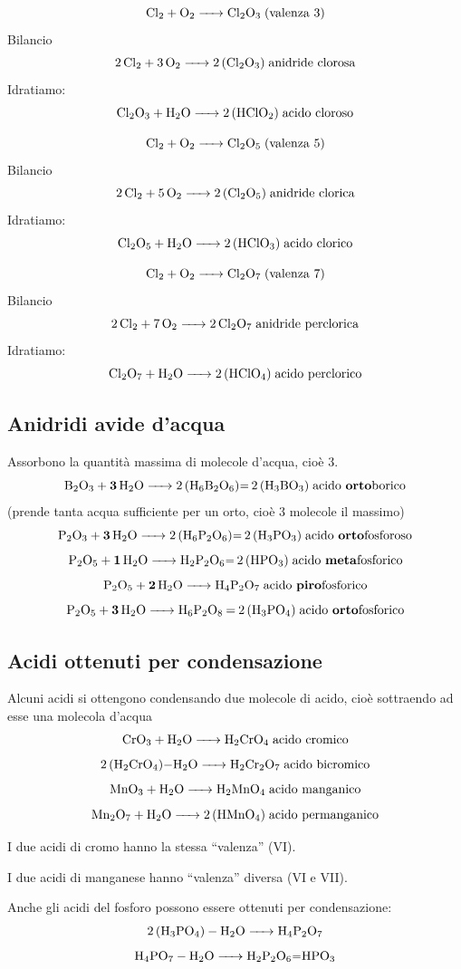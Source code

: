 $$\ce{Cl_2 + O_2 -> Cl_2O_3} \; \text{(valenza 3)}$$ Bilancio
$$\ce{2 Cl_2 + 3 O_2 -> 2 (Cl_2O_3)} \; \text{anidride clorosa}$$
Idratiamo:
$$\ce{Cl_2O_3 + H_2O -> 2 (HClO_2) } \; \text{acido cloroso}$$

$$\ce{Cl_2 + O_2 -> Cl_2O_5} \; \text{(valenza 5)}$$ Bilancio
$$\ce{2 Cl_2 + 5 O_2 -> 2 (Cl_2O_5)} \; \text{anidride clorica}$$
Idratiamo:
$$\ce{Cl_2O_5 + H_2O -> 2 (HClO_3)} \; \text{acido clorico}$$

$$\ce{Cl_2 + O_2 -> Cl_2O_7} \; \text{(valenza 7)}$$ Bilancio
$$\ce{2 Cl_2 + 7 O_2 -> 2 Cl_2O_7} \; \text{anidride perclorica}$$
Idratiamo:
$$\ce{Cl_2O_7 + H_2O -> 2 (HClO_4)} \; \text{acido perclorico}$$

\subsection{Anidridi avide d'acqua}
Assorbono la quantità massima di molecole d'acqua, cioè 3.
$$\ce{B_2O_3 + \textbf{3} H_2O -> 2 (H_6B_2O_6)= 2 (H_3BO_3)} \; \text{acido \textbf{orto}borico}$$\hspace{+1.2cm}(prende tanta acqua sufficiente per un orto, cioè 3 molecole il massimo)
$$\ce{P_2O_3 + \textbf{3} H_2O -> 2 (H_6P_2O_6)= 2 (H_3PO_3)} \; \text{acido \textbf{orto}fosforoso}$$
$$\ce{P_2O_5 + \textbf{1} H_2O -> H_2P_2O_6= 2 (HPO_3)} \; \text{acido \textbf{meta}fosforico}$$
$$\ce{P_2O_5 + \textbf{2} H_2O -> H_4P_2O_7} \; \text{acido \textbf{piro}fosforico}$$
$$\ce{P_2O_5 + \textbf{3} H_2O -> H_6P_2O_8 = 2 (H_3PO_4)} \; \text{acido \textbf{orto}fosforico}$$
\subsection{Acidi ottenuti per condensazione}
Alcuni acidi si ottengono condensando due molecole di acido, cioè sottraendo ad esse una molecola d'acqua
$$\ce{CrO_3 + H_2O -> H_2CrO_4} \; \text{acido cromico}$$
$$\ce{2 (H_2CrO_4)-H_2O -> H_2Cr_2O_7} \; \text{acido bicromico}$$
$$\ce{MnO_3 + H_2O -> H_2MnO_4} \; \text{acido manganico}$$
$$\ce{Mn_2O_7 + H_2O -> 2 (HMnO_4)} \; \text{acido permanganico}$$

I due acidi di cromo hanno la stessa ``valenza” (VI).

I due acidi di manganese hanno ``valenza” diversa (VI e VII).

Anche gli acidi del fosforo possono essere ottenuti per condensazione:
$$\ce{2 (H_3PO_4) - H_2O -> H_4P_2O_7}$$
$$\ce{H_4PO_7 - H_2O -> H_2P_2O_6=HPO_3}$$
